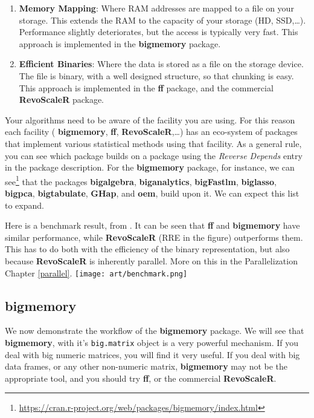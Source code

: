 \documentclass[]{book}
\renewcommand{\href}[2]{#2\footnote{\url{#1}}}
\theoremstyle{definition}
\theoremstyle{definition}
\theoremstyle{definition}
\theoremstyle{remark}
\begin{document}
\begin{enumerate}
\def\labelenumi{\arabic{enumi}.}
\item
  \textbf{Memory Mapping}:
  Where RAM addresses are mapped to a file on your storage.
  This extends the RAM to the capacity of your storage (HD, SSD,\ldots{}).
  Performance slightly deteriorates, but the access is typically very fast.
  This approach is implemented in the \textbf{bigmemory} package.
\item
  \textbf{Efficient Binaries}:
  Where the data is stored as a file on the storage device.
  The file is binary, with a well designed structure, so that chunking is easy.
  This approach is implemented in the \textbf{ff} package, and the commercial \textbf{RevoScaleR} package.
\end{enumerate}

Your algorithms need to be aware of the facility you are using.
For this reason each facility ( \textbf{bigmemory}, \textbf{ff}, \textbf{RevoScaleR},\ldots{}) has an eco-system of packages that implement various statistical methods using that facility.
As a general rule, you can see which package builds on a package using the \emph{Reverse Depends} entry in the package description.
For the \textbf{bigmemory} package, for instance, \href{https://cran.r-project.org/web/packages/bigmemory/index.html}{we can see} that the packages \textbf{bigalgebra}, \textbf{biganalytics}, \textbf{bigFastlm}, \textbf{biglasso}, \textbf{bigpca}, \textbf{bigtabulate}, \textbf{GHap}, and \textbf{oem}, build upon it.
We can expect this list to expand.

Here is a benchmark result, from \citet{wang2015statistical}.
It can be seen that \textbf{ff} and \textbf{bigmemory} have similar performance, while \textbf{RevoScaleR} (RRE in the figure) outperforms them.
This has to do both with the efficiency of the binary representation, but also because \textbf{RevoScaleR} is inherently parallel.
More on this in the Parallelization Chapter \ref{parallel}.
\texttt{[image: art/benchmark.png]}

\hypertarget{bigmemory}{%
\subsection{bigmemory}\label{bigmemory}}

We now demonstrate the workflow of the \textbf{bigmemory} package.
We will see that \textbf{bigmemory}, with it's \texttt{big.matrix} object is a very powerful mechanism.
If you deal with big numeric matrices, you will find it very useful.
If you deal with big data frames, or any other non-numeric matrix, \textbf{bigmemory} may not be the appropriate tool, and you should try \textbf{ff}, or the commercial \textbf{RevoScaleR}.
\end{document}
